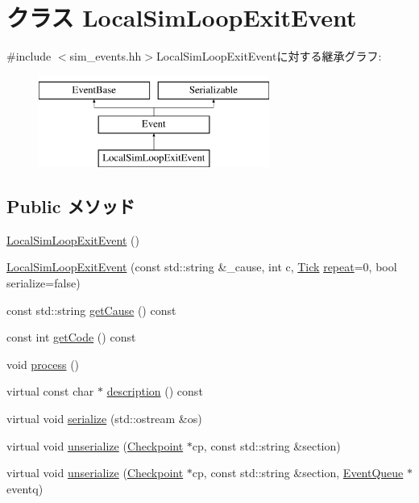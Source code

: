 \hypertarget{classLocalSimLoopExitEvent}{
\section{クラス LocalSimLoopExitEvent}
\label{classLocalSimLoopExitEvent}
}


{\ttfamily \#include $<$sim\_\-events.hh$>$}LocalSimLoopExitEventに対する継承グラフ:\begin{figure}[H]
\begin{center}
\leavevmode
\includegraphics[height=3cm]{classLocalSimLoopExitEvent}
\end{center}
\end{figure}
\subsection*{Public メソッド}
\begin{DoxyCompactItemize}
\item 
\hyperlink{classLocalSimLoopExitEvent_ae315899569f1c07a8f93478d48046c97}{LocalSimLoopExitEvent} ()
\item 
\hyperlink{classLocalSimLoopExitEvent_aa58357821a2996d059c18c0c8c6d40d9}{LocalSimLoopExitEvent} (const std::string \&\_\-cause, int c, \hyperlink{base_2types_8hh_a5c8ed81b7d238c9083e1037ba6d61643}{Tick} \hyperlink{classLocalSimLoopExitEvent_a186e97c430ff343e8ab14129eaa8375d}{repeat}=0, bool serialize=false)
\item 
const std::string \hyperlink{classLocalSimLoopExitEvent_adf610f0866baa489220e6d9f9e24cb4d}{getCause} () const 
\item 
const int \hyperlink{classLocalSimLoopExitEvent_a58a2e3d87f99241c0363c9765b3ef3e9}{getCode} () const 
\item 
void \hyperlink{classLocalSimLoopExitEvent_a2e9c5136d19b1a95fc427e0852deab5c}{process} ()
\item 
virtual const char $\ast$ \hyperlink{classLocalSimLoopExitEvent_a5a14fe478e2393ff51f02e9b7be27e00}{description} () const 
\item 
virtual void \hyperlink{classLocalSimLoopExitEvent_ad6272f80ae37e8331e3969b3f072a801}{serialize} (std::ostream \&os)
\item 
virtual void \hyperlink{classLocalSimLoopExitEvent_af100c4e9feabf3cd918619c88c718387}{unserialize} (\hyperlink{classCheckpoint}{Checkpoint} $\ast$cp, const std::string \&section)
\item 
virtual void \hyperlink{classLocalSimLoopExitEvent_a906bb365c627ae3a9ae49fc646d267cf}{unserialize} (\hyperlink{classCheckpoint}{Checkpoint} $\ast$cp, const std::string \&section, \hyperlink{classEventQueue}{EventQueue} $\ast$eventq)
\end{DoxyCompactItemize}

